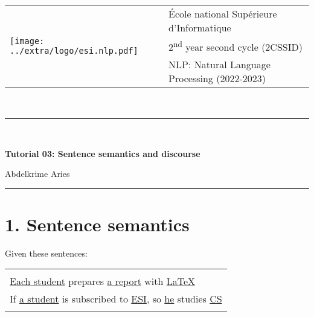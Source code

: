 \documentclass[11pt, a4paper]{article}
\begin{document}

\noindent
\begin{tabular}{ll}
\multirow{3}{*}{\texttt{[image: ../extra/logo/esi.nlp.pdf]}} & 
\'Ecole national Supérieure d'Informatique\\
& 2\textsuperscript{nd} year second cycle (2CSSID)\\
& NLP: Natural Language Processing (2022-2023)
\end{tabular}\\[.25cm]
\noindent\rule{\textwidth}{2pt}\\[-0.5cm]
\begin{center}
{\LARGE \textbf{Tutorial 03: Sentence semantics and discourse}}
\begin{flushright}
	Abdelkrime Aries
\end{flushright}
\end{center}\vspace{-0.5cm}
\noindent\rule{\textwidth}{2pt}

\section*{1. Sentence semantics}

Given these sentences:
\begin{center}
	\begin{tabular}{|l|}
	\hline 
	\\
	\ul{Each student} prepares \ul{a report} with \ul{\LaTeX} \\
	If \ul{a student} is subscribed to \ul{ESI}, so \ul{he} studies \ul{CS}\\
	\\
	\hline 
\end{tabular}
\end{center}
\end{document}
